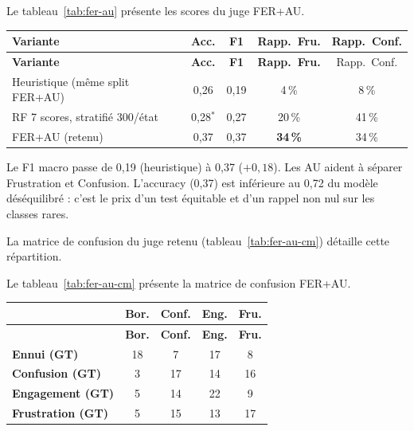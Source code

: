 Le tableau~\ref{tab:fer-au} présente les scores du juge FER+AU.

{\small
\renewcommand{\arraystretch}{1.18}
\setlength{\tabcolsep}{4pt}
\begin{xltabular}{\textwidth}{|>{\raggedright\arraybackslash}X|c|c|c|c|}
\hline
{}
\textbf{Variante} & \textbf{Acc.} & \textbf{F1} &
\textbf{Rapp.\ Fru.} & Rapp.\ Conf. \\
\hline
\endfirsthead
\hline
{}
\textbf{Variante} & \textbf{Acc.} & \textbf{F1} &
\textbf{Rapp.\ Fru.} & Rapp.\ Conf. \\
\hline
\endhead
\endfoot
\endlastfoot
Heuristique (même split FER+AU) & 0{,}26 & 0{,}19 & 4\,\% & 8\,\% \\
\hline
RF 7 scores, stratifié 300/état & 0{,}28$^*$ & 0{,}27 & 20\,\% & 41\,\% \\
\hline
FER+AU (retenu) & 0{,}37 & 0{,}37 &
\textbf{34\,\%} & 34\,\% \\
\hline
\end{xltabular}
\label{tab:fer-au}
}


Le F1 macro passe de 0{,}19 (heuristique) à 0{,}37 ($+0{,}18$).
Les AU aident à séparer Frustration et Confusion. L'accuracy (0{,}37) est
inférieure au 0{,}72 du modèle déséquilibré : c'est le prix d'un
test équitable et d'un rappel non nul sur les classes rares.

La matrice de confusion du juge retenu
(tableau~\ref{tab:fer-au-cm}) détaille cette répartition.

Le tableau~\ref{tab:fer-au-cm} présente la matrice de confusion FER+AU.

{\small
\renewcommand{\arraystretch}{1.18}
\setlength{\tabcolsep}{4pt}
\begin{xltabular}{\textwidth}{|>{\raggedright\arraybackslash}X|c|c|c|c|}
\hline
{}
 & \textbf{Bor.} & \textbf{Conf.} & \textbf{Eng.} & \textbf{Fru.} \\
\hline
\endfirsthead
\hline
{}
 & \textbf{Bor.} & \textbf{Conf.} & \textbf{Eng.} & \textbf{Fru.} \\
\hline
\endhead
\endfoot
\endlastfoot
\textbf{Ennui (GT)} & 18 & 7 & 17 & 8 \\
\hline
\textbf{Confusion (GT)} & 3 & 17 & 14 & 16 \\
\hline
\textbf{Engagement (GT)} & 5 & 14 & 22 & 9 \\
\hline
\textbf{Frustration (GT)} & 5 & 15 & 13 & 17 \\
\hline
\end{xltabular}
\label{tab:fer-au-cm}
}

